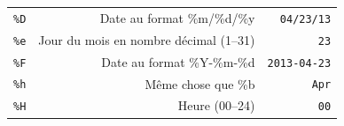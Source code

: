 \documentclass[12pt,]{book}
\numberwithin{equation}{section}
\numberwithin{countremarque}{section}
\begin{document}
\begin{longtable}[]{@{}rrr@{}}
\begin{minipage}[t]{0.10\columnwidth}
\texttt{\%D}\strut
\end{minipage} & \begin{minipage}[t]{0.60\columnwidth}\raggedleft\strut
Date au format \%m/\%d/\%y\strut
\end{minipage} & \begin{minipage}[t]{0.22\columnwidth}\raggedleft\strut
\texttt{04/23/13}\strut
\end{minipage}\tabularnewline
\begin{minipage}[t]{0.10\columnwidth}\raggedleft\strut
\texttt{\%e}\strut
\end{minipage} & \begin{minipage}[t]{0.60\columnwidth}\raggedleft\strut
Jour du mois en nombre décimal (1--31)\strut
\end{minipage} & \begin{minipage}[t]{0.22\columnwidth}\raggedleft\strut
\texttt{23}\strut
\end{minipage}\tabularnewline
\begin{minipage}[t]{0.10\columnwidth}\raggedleft\strut
\texttt{\%F}\strut
\end{minipage} & \begin{minipage}[t]{0.60\columnwidth}\raggedleft\strut
Date au format \%Y-\%m-\%d\strut
\end{minipage} & \begin{minipage}[t]{0.22\columnwidth}\raggedleft\strut
\texttt{2013-04-23}\strut
\end{minipage}\tabularnewline
\begin{minipage}[t]{0.10\columnwidth}\raggedleft\strut
\texttt{\%h}\strut
\end{minipage} & \begin{minipage}[t]{0.60\columnwidth}\raggedleft\strut
Même chose que \%b\strut
\end{minipage} & \begin{minipage}[t]{0.22\columnwidth}\raggedleft\strut
\texttt{Apr}\strut
\end{minipage}\tabularnewline
\begin{minipage}[t]{0.10\columnwidth}\raggedleft\strut
\texttt{\%H}\strut
\end{minipage} & \begin{minipage}[t]{0.60\columnwidth}\raggedleft\strut
Heure (00--24)\strut
\end{minipage} & \begin{minipage}[t]{0.22\columnwidth}\raggedleft\strut
\texttt{00}\strut
\end{minipage}\tabularnewline

\end{longtable}
\end{document}
